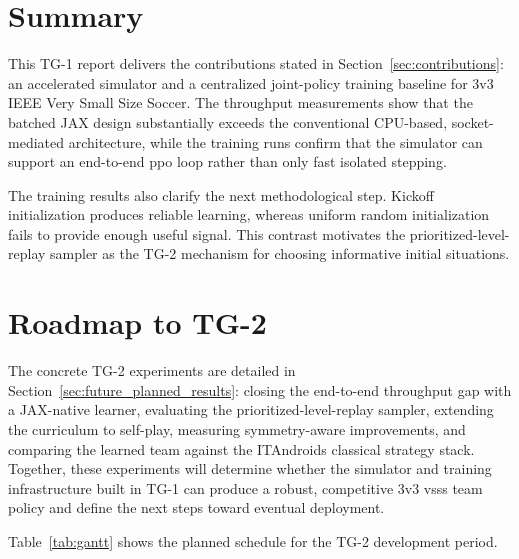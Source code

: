 \section{Summary}

This TG-1 report delivers the contributions stated in
Section~\ref{sec:contributions}: an accelerated simulator and a centralized
joint-policy training baseline for 3v3 IEEE Very Small Size Soccer.  The
throughput measurements show that the batched JAX design substantially exceeds
the conventional CPU-based, socket-mediated architecture, while the training
runs confirm that the simulator can support an end-to-end \gls{ppo} loop rather
than only fast isolated stepping.

The training results also clarify the next methodological step.  Kickoff
initialization produces reliable learning, whereas uniform random
initialization fails to provide enough useful signal.  This contrast motivates
the prioritized-level-replay sampler as the TG-2 mechanism for choosing
informative initial situations.

\section{Roadmap to TG-2}

The concrete TG-2 experiments are detailed in
Section~\ref{sec:future_planned_results}: closing the end-to-end throughput gap
with a JAX-native learner, evaluating the
prioritized-level-replay sampler, extending the curriculum to self-play,
measuring symmetry-aware improvements, and comparing the learned team against
the ITAndroids classical strategy stack.  Together, these experiments will
determine whether the simulator and training infrastructure built in TG-1 can
produce a robust, competitive 3v3 \gls{vsss} team policy and define the next
steps toward eventual deployment.

Table~\ref{tab:gantt} shows the planned schedule for the TG-2 development period.


